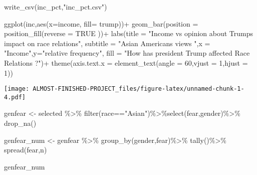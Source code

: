 \documentclass[
]{article}
\newenvironment{Shaded}{\begin{snugshade}}{\end{snugshade}}
\newcommand{\AttributeTok}[1]{\textcolor[rgb]{0.77,0.63,0.00}{#1}}
\newcommand{\ConstantTok}[1]{\textcolor[rgb]{0.00,0.00,0.00}{#1}}
\newcommand{\DecValTok}[1]{\textcolor[rgb]{0.00,0.00,0.81}{#1}}
\newcommand{\FunctionTok}[1]{\textcolor[rgb]{0.00,0.00,0.00}{#1}}
\newcommand{\NormalTok}[1]{#1}
\newcommand{\OtherTok}[1]{\textcolor[rgb]{0.56,0.35,0.01}{#1}}
\newcommand{\SpecialCharTok}[1]{\textcolor[rgb]{0.00,0.00,0.00}{#1}}
\newcommand{\StringTok}[1]{\textcolor[rgb]{0.31,0.60,0.02}{#1}}
\begin{document}
\begin{Shaded}
\begin{Highlighting}[]
\FunctionTok{write\_csv}\NormalTok{(inc\_pct,}\StringTok{"inc\_pct.csv"}\NormalTok{)}

\FunctionTok{ggplot}\NormalTok{(inc,}\FunctionTok{aes}\NormalTok{(}\AttributeTok{x=}\NormalTok{income, }\AttributeTok{fill=}\NormalTok{ trump))}\SpecialCharTok{+}
  \FunctionTok{geom\_bar}\NormalTok{(}\AttributeTok{position =} \FunctionTok{position\_fill}\NormalTok{(}\AttributeTok{reverse =} \ConstantTok{TRUE}\NormalTok{ ))}\SpecialCharTok{+} 
  \FunctionTok{labs}\NormalTok{(}\AttributeTok{title =} \StringTok{"Income vs opinion about Trump\textquotesingle{}s impact on race relations"}\NormalTok{,}
       \AttributeTok{subtitle =} \StringTok{"Asian Americans views "}\NormalTok{,}\AttributeTok{x =} \StringTok{"Income"}\NormalTok{,}\AttributeTok{y=}\StringTok{"relative frequency"}\NormalTok{, }
       \AttributeTok{fill =} \StringTok{"How has president Trump affected Race Relations ?"}\NormalTok{)}\SpecialCharTok{+}
  \FunctionTok{theme}\NormalTok{(}\AttributeTok{axis.text.x =} \FunctionTok{element\_text}\NormalTok{(}\AttributeTok{angle =} \DecValTok{60}\NormalTok{,}\AttributeTok{vjust =} \DecValTok{1}\NormalTok{,}\AttributeTok{hjust =} \DecValTok{1}\NormalTok{))}
\end{Highlighting}
\end{Shaded}

\texttt{[image: ALMOST-FINISHED-PROJECT\_files/figure-latex/unnamed-chunk-1-4.pdf]}

\begin{Shaded}
\begin{Highlighting}[]
\NormalTok{genfear }\OtherTok{\textless{}{-}}\NormalTok{ selected }\SpecialCharTok{\%\textgreater{}\%} \FunctionTok{filter}\NormalTok{(race}\SpecialCharTok{==}\StringTok{"Asian"}\NormalTok{)}\SpecialCharTok{\%\textgreater{}\%}\FunctionTok{select}\NormalTok{(fear,gender)}\SpecialCharTok{\%\textgreater{}\%} \FunctionTok{drop\_na}\NormalTok{()}

\NormalTok{genfear\_num }\OtherTok{\textless{}{-}}\NormalTok{ genfear }\SpecialCharTok{\%\textgreater{}\%}
  \FunctionTok{group\_by}\NormalTok{(gender,fear)}\SpecialCharTok{\%\textgreater{}\%}
  \FunctionTok{tally}\NormalTok{()}\SpecialCharTok{\%\textgreater{}\%}
  \FunctionTok{spread}\NormalTok{(fear,n)}

\NormalTok{genfear\_num}
\end{Highlighting}
\end{Shaded}
\end{document}
